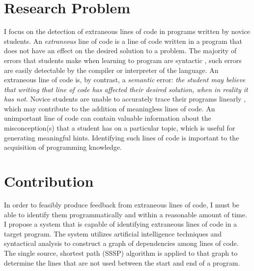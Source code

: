 \section{Research Problem}

I focus on the detection of extraneous lines of code in programs written by novice students. An \emph{extraneous} line of code is a line of code written in a program that does not have an effect on the desired solution to a problem. The majority of errors that students make when learning to program are syntactic \cite{Altadmri2015}, such errors are easily detectable by the compiler or interpreter of the language. An extraneous line of code is, by contrast, a \emph{semantic} error: \emph{the student may believe that writing that line of code has affected their desired solution, when in reality it has not.} Novice students are unable to accurately trace their programs linearly \cite{Kaczmarczyk2010}, which may contribute to the addition of meaningless lines of code. An unimportant line of code can contain valuable information about the misconception(s) that a student has on a particular topic, which is useful for generating meaningful hints. Identifying such lines of code is important to the acquisition of programming knowledge.



\section{Contribution}
In order to feasibly produce feedback from extraneous lines of code, I must be able to identify them programmatically and within a reasonable amount of time. I propose a system that is capable of identifying extraneous lines of code in a target program. The system utilizes artificial intelligence techniques and syntactical analysis to construct a graph of dependencies among lines of code. The single source, shortest path (SSSP) algorithm is applied to that graph to determine the lines that are not used between the start and end of a program.

